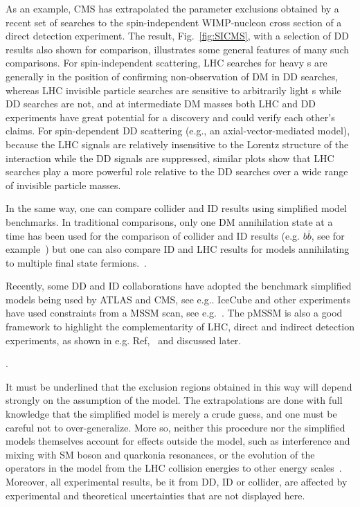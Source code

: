 As an example, CMS has extrapolated the parameter exclusions obtained by a recent set of searches to the spin-independent WIMP-nucleon cross section of a direct detection experiment.
The result, Fig.~\ref{fig:SICMS}, with a selection of DD results also shown for comparison, illustrates some general features of many such comparisons.
For spin-independent scattering, LHC searches for heavy {\IP}s are generally in the position of confirming non-observation of DM in DD searches, whereas LHC invisible particle searches are sensitive to arbitrarily light {\IP}s while DD searches are not, and at intermediate DM masses both LHC and DD experiments have great potential for a discovery and could verify each other's claims.
For spin-dependent DD scattering (e.g., an axial-vector-mediated model), because the LHC signals are relatively insensitive to the Lorentz structure of the interaction while the DD signals are suppressed, similar plots show that LHC searches play a more powerful role relative to the DD searches over a wide range of invisible particle masses. 

In the same way, one can compare collider and ID results using simplified model benchmarks. In traditional comparisons, only one DM annihilation state at a time has been used for the comparison of collider and ID results (e.g. $b\bar{b}$, see for example~\cite{Agrawal:2014una}) but one can also compare ID and LHC results for models annihilating to multiple final state fermions.~\cite{Carpenter:2016thc}.

Recently, some DD and ID collaborations have adopted the benchmark simplified models being used by ATLAS and CMS, see e.g.\cite{PhysRevLett.118.251301,Balazs:2017hxh}.
IceCube and other experiments have used constraints from a MSSM scan, see e.g.~\cite{Aartsen:2016zhm}. The pMSSM is also a good framework to highlight the complementarity of LHC, direct and indirect detection experiments, as shown in e.g. Ref,~\cite{Cahill-Rowley:2014twa} and discussed later. %

\begin{marginnote}[]
\end{marginnote}. 

It must be underlined that the exclusion regions obtained in this way will depend strongly on the assumption of the model.
The extrapolations are done with full knowledge that the simplified model is merely a crude guess, and one must be careful not to over-generalize.
More so, neither this procedure nor the simplified models themselves account for effects outside the model, such as interference and mixing with SM boson and quarkonia resonances, or the evolution of the operators in the model from the LHC collision energies to other energy scales~\cite{DEramo:2014nmf}.
Moreover, all experimental results, be it from DD, ID or collider, are affected by experimental and theoretical uncertainties that are not displayed here.


